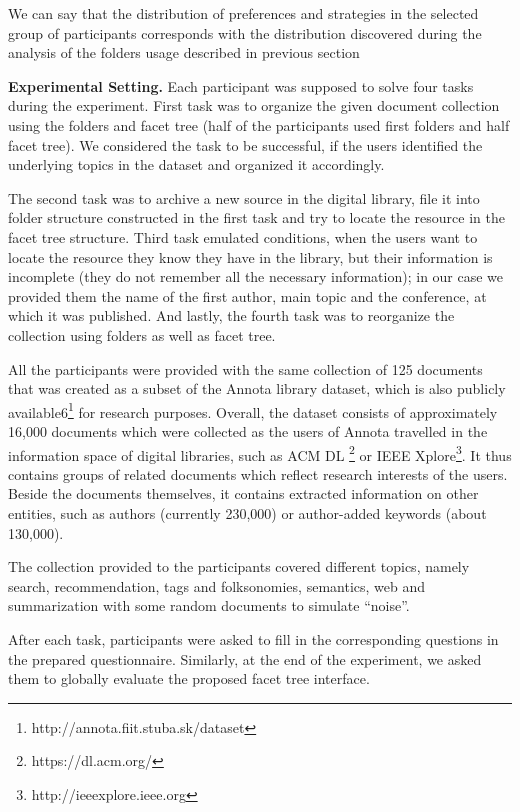 \documentclass[12pt]{article}
\begin{document}
We can say that the distribution of preferences and strategies in the selected group of participants corresponds with the distribution discovered during the analysis of the folders usage described in previous section

\textbf{Experimental Setting.}
  Each participant was supposed to solve four tasks during the experiment. First task was to organize the given document collection using the folders  and facet tree (half of the participants used first folders and half facet tree). We considered the task to be successful, if the users identified the underlying topics in the dataset and organized it accordingly. 
  
   The second task was to archive a new source in the digital library, file it into folder structure constructed in the first task and try to locate the resource in the facet tree structure. Third task emulated conditions, when the users want to locate the resource they know they have in the library, but their information is incomplete (they do not remember all the necessary information); in our case we provided them the name of the first author, main topic and the conference, at which it was published. And lastly, the fourth task was to reorganize the collection using folders as well as facet tree.
   
    All the participants were provided with the same collection of 125 documents that was created as a subset of the Annota library dataset, which is also publicly available6\footnote{http://annota.fiit.stuba.sk/dataset} for research purposes. Overall, the dataset consists of approximately 16,000 documents which were collected as the users of Annota travelled in the information space of digital libraries, such as ACM DL \footnote{https://dl.acm.org/} or IEEE Xplore\footnote{http://ieeexplore.ieee.org}. It thus contains groups of related documents which reflect research interests of the users. Beside the documents themselves, it contains extracted information on other entities, such as authors (currently 230,000) or author-added keywords (about 130,000). 
    
     The collection provided to the participants covered different topics, namely search, recommendation, tags and folksonomies, semantics, web and summarization with some random documents to simulate “noise”. 
     
     After each task, participants were asked to fill in the corresponding questions in the prepared questionnaire. Similarly, at the end of the experiment, we asked them to globally evaluate the proposed facet tree interface.
   
\end{document}
